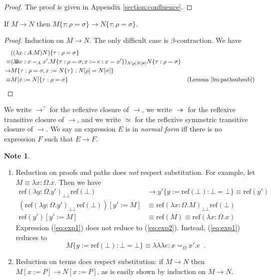\documentclass[a4paper,UKenglish]{lipics-v2016}
\newcommand*{\reff}[1]{\ensuremath{\mathrm{ref} \left( {#1} \right)}}
\newcommand*{\triplelambda}{\ensuremath{\lambda \!\! \lambda \!\! \lambda}}
\theoremstyle{plain}
\theoremstyle{definition}
\newtheorem{note}[theorem]{Note}
\begin{document}
\begin{proof}
The proof is given in Appendix \ref{section:confluence}.
\end{proof}

\begin{lemma}
\label{lm:resp-sub}
If $M \rightarrow N$ then $M \{ \tau : \rho = \sigma \} \rightarrow N \{ \tau : \rho = \sigma \}$.
\end{lemma}

\begin{proof}
Induction on $M \rightarrow N$.  The only difficult case is $\beta$-contraction.  We have
\begin{align*}
& ((\lambda x:A.M)N)\{ \tau : \rho = \sigma \} \\
\equiv & (\triplelambda e : x =_A x' . M \{ \tau : \rho = \sigma , x := e : x = x' \})_{N [ \rho ] N [ \sigma ]} N \{ \tau : \rho = \sigma \} \\
\rightarrow & M \{ \tau : \rho = \sigma, x := N \{ \tau \} : N [ \rho ] = N [ \sigma ] \} \\
\equiv & M [ x := N ] \{ \tau : \rho = \sigma \} & (\text{Lemma \ref{lm:pathsubsub}})
\end{align*}
\end{proof}

We write $\rightarrow^?$ for the reflexive closure of $\rightarrow$, 
we write $\twoheadrightarrow$ for the reflexive transitive closure of $\rightarrow$, and we write $\simeq$ for the reflexive symmetric transitive closure of $\rightarrow$.
We say an expression $E$ is in \emph{normal form} iff there is no expression $F$ such that $E \rightarrow F$.

\begin{note}
$ $
\begin{enumerate}
\item
Reduction on proofs and paths does \emph{not} respect substitution.  For example, let $M \equiv \lambda x:\Omega.x$.  Then we have
\begin{align}
\reff{\lambda y : \Omega. y'}_{\bot \bot} \reff{\bot} & \rightarrow y' \{ y:= \reff{\bot} : \bot = \bot \} \equiv \reff{y'} \nonumber \\
(\reff{\lambda y : \Omega.y'}_{\bot \bot} \reff{\bot}) [y' := M] & \equiv \reff{\lambda x : \Omega.M}_{\bot \bot} \reff{\bot}
\label{eq:exp1} \\
\label{eq:exp2}
\reff{y'}[y':=M] & \equiv \reff{M} \equiv \reff{\lambda x : \Omega.x}
\end{align}
Expression (\ref{eq:exp1}) does not reduce to (\ref{eq:exp2}).  Instead, (\ref{eq:exp1}) reduces to
$$ M \{ y := \reff{\bot} : \bot = \bot \} \equiv \triplelambda e : x =_\Omega x'. e \enspace . $$
\item
Reduction on terms does respect substitution: if $M \rightarrow N$ then $M[x:=P] \rightarrow N[x:=P]$, as is easily shown by induction on $M \rightarrow N$.
\end{enumerate}
\end{note}
\end{document}
